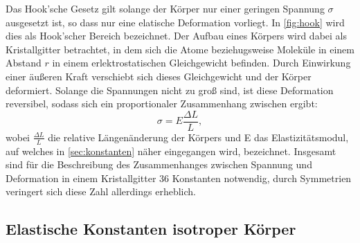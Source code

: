     Das Hook'sche Gesetz gilt solange der Körper nur einer geringen Spannung $\sigma$ ausgesetzt ist, so dass nur eine elatische 
    Deformation vorliegt. In \autoref{fig:hook} wird dies als Hook'scher Bereich bezeichnet. Der Aufbau eines Körpers wird dabei
    als Kristallgitter betrachtet, in dem sich die Atome beziehugsweise Moleküle in einem Abstand $r$ in einem erlektrostatischen
    Gleichgewicht befinden. Durch Einwirkung einer äußeren Kraft verschiebt sich dieses Gleichgewicht und der Körper deformiert.
    Solange die Spannungen nicht zu groß sind, ist diese Deformation reversibel, sodass sich ein proportionaler Zusammenhang zwischen
    ergibt:
    \begin{equation}
    \label{eqn:hook}
        \sigma = E \frac {\Delta L} {L},
    \end{equation}     
    wobei $\frac {\Delta L}{L}$ die relative Längenänderung der Körpers und E das Elastizitätsmodul, auf welches in \autoref{sec:konstanten}
    näher eingegangen wird, bezeichnet.
    Insgesamt sind für die Beschreibung des Zusammenhanges zwischen Spannung und Deformation in einem Kristallgitter 36 Konstanten
    notwendig, durch Symmetrien veringert sich diese Zahl allerdings erheblich. 
    \subsection{Elastische Konstanten isotroper Körper}
    \label{sec:konstanten}
